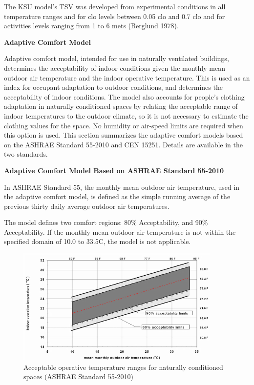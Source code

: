 The KSU model's TSV was developed from experimental conditions in all temperature ranges and for clo levels between 0.05 clo and 0.7 clo and for activities levels ranging from 1 to 6 mets (Berglund 1978).

\textbf{Adaptive Comfort Model}

Adaptive comfort model, intended for use in naturally ventilated buildings, determines the acceptability of indoor conditions given the monthly mean outdoor air temperature and the indoor operative temperature. This is used as an index for occupant adaptation to outdoor conditions, and determines the acceptability of indoor conditions. The model also accounts for people's clothing adaptation in naturally conditioned spaces by relating the acceptable range of indoor temperatures to the outdoor climate, so it is not necessary to estimate the clothing values for the space. No humidity or air-speed limits are required when this option is used. This section summarizes the adaptive comfort models based on the ASHRAE Standard 55-2010 and CEN 15251. Details are available in the two standards.

\textbf{Adaptive Comfort Model Based on ASHRAE Standard 55-2010}

In ASHRAE Standard 55, the monthly mean outdoor air temperature, used in the adaptive comfort model, is defined as the simple running average of the previous thirty daily average outdoor air temperatures.

The model defines two comfort regions: 80\% Acceptability, and 90\% Acceptability. If the monthly mean outdoor air temperature is not within the specified domain of 10.0 to 33.5C, the model is not applicable.

\begin{figure}[hbtp] %
\centering
\includegraphics[width=0.9\textwidth, height=0.9\textheight, keepaspectratio=true]{media/image6814.png}
\caption{Acceptable operative temperature ranges for naturally conditioned spaces (ASHRAE Standard 55-2010) \protect \label{fig:acceptable-operative-temperature-ranges-for}}
\end{figure}

